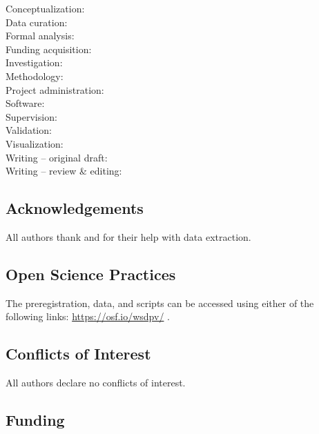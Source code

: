 \documentclass[
  man, donotrepeattitle,mask,floatsintext]{apa7}
\begin{document}
\noindent Conceptualization: \\
\noindent Data curation: \\
\noindent Formal analysis: \\
\noindent Funding acquisition: \\
\noindent Investigation: \\
\noindent Methodology: \\
\noindent Project administration: \\
\noindent Software: \\
\noindent Supervision: \\
\noindent Validation: \\
\noindent Visualization: \\
\noindent Writing -- original draft: \\
\noindent Writing -- review \& editing: 

\hypertarget{acknowledgements}{%
\subsection{Acknowledgements}\label{acknowledgements}}

\noindent All authors thank  and  for their help with data extraction.

\hypertarget{open-science-practices}{%
\subsection{Open Science Practices}\label{open-science-practices}}

\noindent The preregistration, data, and scripts can be accessed using either of the following links: \url{https://osf.io/wsdpv/}  .

\hypertarget{conflicts-of-interest}{%
\subsection{Conflicts of Interest}\label{conflicts-of-interest}}

\noindent All authors declare no conflicts of interest.

\hypertarget{funding}{%
\subsection{Funding}\label{funding}}
\end{document}
